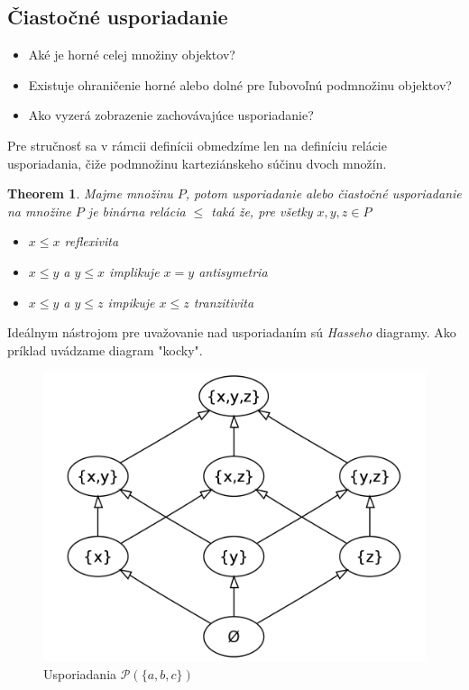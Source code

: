 \documentclass[a4paper,10pt,oneside]{report}%
\newtheorem{theorem}{Theorem}
\begin{document}
\subsection{Čiastočné usporiadanie}
\begin{itemize}
    \item Aké je horné celej množiny objektov?
    \item Existuje ohraničenie horné alebo dolné pre ľubovoľnú podmnožinu objektov?
    \item Ako vyzerá zobrazenie zachovávajúce usporiadanie?
\end{itemize}
    Pre stručnosť sa v rámcii definícii obmedzíme len na definíciu relácie usporiadania,
čiže podmnožinu karteziánskeho súčinu dvoch množín.
\begin{theorem}
    Majme množinu $P$, potom usporiadanie alebo čiastočné usporiadanie na množine
    $P$ je binárna relácia $\leq$ taká že, pre všetky $x,y,z \in P$
    \begin{itemize}
        \item $x \leq x$ reflexivita
        \item $x \leq y$ a $y \leq x$ implikuje $x = y$ antisymetria
        \item $x \leq y$ a $y \leq z$ impikuje $x \leq z$ tranzitivita
    \end{itemize}
\end{theorem}
    Ideálnym nástrojom pre uvažovanie nad usporiadaním sú \emph{Hasseho} diagramy.
    Ako príklad uvádzame diagram "kocky".
\begin{figure}[!ht]
    \centering
    \includegraphics[scale=0.15]{cube.png}
    \caption{Usporiadania $\mathcal{P}(\{a,b,c\})$}
\end{figure}
\end{document}

